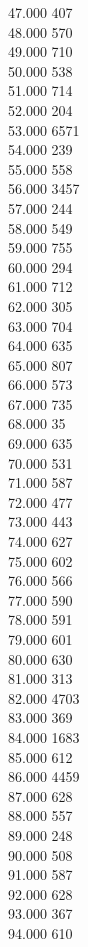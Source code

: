 { 47.000	407 \\
 48.000	570 \\
 49.000	710 \\
 50.000	538 \\
 51.000	714 \\
 52.000	204 \\
 53.000	6571 \\
 54.000	239 \\
 55.000	558 \\
 56.000	3457 \\
 57.000	244 \\
 58.000	549 \\
 59.000	755 \\
 60.000	294 \\
 61.000	712 \\
 62.000	305 \\
 63.000	704 \\
 64.000	635 \\
 65.000	807 \\
 66.000	573 \\
 67.000	735 \\
 68.000	35 \\
 69.000	635 \\
 70.000	531 \\
 71.000	587 \\
 72.000	477 \\
 73.000	443 \\
 74.000	627 \\
 75.000	602 \\
 76.000	566 \\
 77.000	590 \\
 78.000	591 \\
 79.000	601 \\
 80.000	630 \\
 81.000	313 \\
 82.000	4703 \\
 83.000	369 \\
 84.000	1683 \\
 85.000	612 \\
 86.000	4459 \\
 87.000	628 \\
 88.000	557 \\
 89.000	248 \\
 90.000	508 \\
 91.000	587 \\
 92.000	628 \\
 93.000	367 \\
 94.000	610 \\
}
